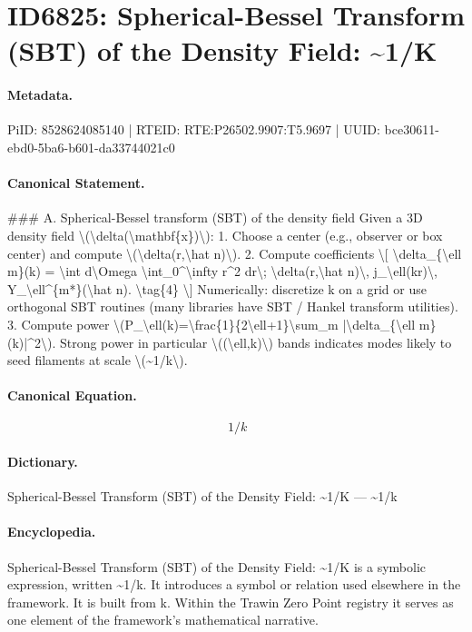 \section*{ID6825: Spherical-Bessel Transform (SBT) of the Density Field: \textasciitilde{}1/K}
\paragraph{Metadata.}
PiID: 8528624085140 | RTEID: RTE:P26502.9907:T5.9697 | UUID: bce30611-ebd0-5ba6-b601-da33744021c0

\paragraph{Canonical Statement.}
\#\#\# A. Spherical-Bessel transform (SBT) of the density field Given a 3D density field \textbackslash{}(\textbackslash{}delta(\textbackslash{}mathbf\{x\})\textbackslash{}): 1. Choose a center (e.g., observer or box center) and compute \textbackslash{}(\textbackslash{}delta(r,\textbackslash{}hat n)\textbackslash{}). 2. Compute coefficients \textbackslash{}[ \textbackslash{}delta\_\{\textbackslash{}ell m\}(k) = \textbackslash{}int d\textbackslash{}Omega \textbackslash{}int\_0\textasciicircum{}\textbackslash{}infty r\textasciicircum{}2 dr\textbackslash{}; \textbackslash{}delta(r,\textbackslash{}hat n)\textbackslash{}, j\_\textbackslash{}ell(kr)\textbackslash{}, Y\_\textbackslash{}ell\textasciicircum{}\{m*\}(\textbackslash{}hat n). \textbackslash{}tag\{4\} \textbackslash{}] Numerically: discretize k on a grid or use orthogonal SBT routines (many libraries have SBT / Hankel transform utilities). 3. Compute power \textbackslash{}(P\_\textbackslash{}ell(k)=\textbackslash{}frac\{1\}\{2\textbackslash{}ell+1\}\textbackslash{}sum\_m |\textbackslash{}delta\_\{\textbackslash{}ell m\}(k)|\textasciicircum{}2\textbackslash{}). Strong power in particular \textbackslash{}((\textbackslash{}ell,k)\textbackslash{}) bands indicates modes likely to seed filaments at scale \textbackslash{}(\textasciitilde{}1/k\textbackslash{}).

\paragraph{Canonical Equation.}
\[
~1/k
\]

\paragraph{Dictionary.}
Spherical-Bessel Transform (SBT) of the Density Field: \textasciitilde{}1/K — \textasciitilde{}1/k

\paragraph{Encyclopedia.}
Spherical-Bessel Transform (SBT) of the Density Field: \textasciitilde{}1/K is a symbolic expression, written \textasciitilde{}1/k. It introduces a symbol or relation used elsewhere in the framework. It is built from k. Within the Trawin Zero Point registry it serves as one element of the framework's mathematical narrative.
